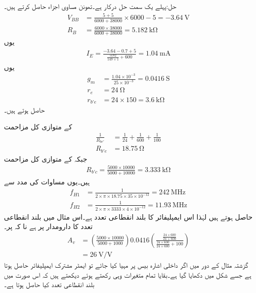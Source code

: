 حل:پہلے یک سمت  حل درکار ہے۔تھونن مساوی اجزاء حاصل  کرتے ہیں۔
\begin{align*}
V_{BB}&=\frac{5+5}{6000+38000} \times 6000-5=\SI{-3.64}{\volt}\\
R_B&=\frac{6000 \times 38000}{6000 +38000}=\SI{5.182}{\kilo \ohm}
\end{align*}
یوں
\begin{align*}
I_E=\frac{-3.64-0.7+5}{\frac{5182}{149+1}+600}=\SI{1.04}{\milli \ampere}
\end{align*}
یوں
\begin{align*}
g_m&=\frac{1.04 \times 10^{-3}}{25 \times 10^{-3}}=\SI{0.0416}{\siemens}\\
r_e&=\SI{24}{\ohm}\\
r_{b'e}&=24 \times 150=\SI{3.6}{\kilo \ohm}
\end{align*}
حاصل ہوتے ہیں۔

 کے متوازی کل مزاحمت 
\begin{align*}
\frac{1}{R_{be'}}&=\frac{1}{24}+\frac{1}{600}+\frac{1}{100}\\
R_{b'e}&=\SI{18.75}{\ohm}
\end{align*}
جبکہ  کے متوازی کل مزاحمت
\begin{align*}
R_{b'c}=\frac{5000 \times 10000}{5000+10000}=\SI{3.333}{\kilo \ohm}
\end{align*}
ہیں۔یوں مساوات  کی مدد سے
\begin{align*}
f_{H1}&=\frac{1}{2 \times \pi \times 18.75 \times 35 \times 10^{-12}}=\SI{242}{\mega \hertz}\\
f_{H2}&=\frac{1}{2 \times \pi \times 3333 \times 4 \times 10^{-12}}=\SI{11.93}{\mega \hertz}
\end{align*}
حاصل ہوتے ہیں لہٰذا اس ایمپلیفائر کا بلند انقطاعی تعدد  ہے۔اس مثال میں بلند انقطاعی تعدد کا دارومدار   پر ہے نا کہ  پر۔
\begin{align*}
A_v&=\left(\frac{5000 \times 10000}{5000+1000}\right) 0.0416 \left(\frac{\frac{24 \times 600}{24+600}}{\frac{24 \times 600}{24+600} +100} \right)\\
&=\SI{26}{\volt \per \volt}
\end{align*}
گزشتہ مثال کے دور میں اگر داخلی اشارہ بیس  پر مہیا کیا جائے تو ایمٹر        مشترک ایمپلیفائر حاصل ہوتا ہے جسے شکل  میں دکھایا گیا ہے۔بقایا تمام متغیرات وہی رکھتے ہوئے دیکھتے ہیں کہ اس صورت میں بلند انقطاعی تعدد کیا حاصل ہوتا ہے۔


